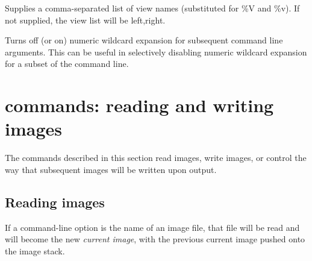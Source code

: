 Supplies a comma-separated list of view names (substituted for {\cf \%V}
and {\cf \%v}). If not supplied, the view list will be {\cf left,right}.
\apiend

Turns off (or on) numeric wildcard expansion for subsequent command
line arguments. This can be useful in selectively disabling numeric wildcard
expansion for a subset of the command line.
\apiend

\section{\oiiotool commands: reading and writing images}

The commands described in this section read images, write images,
or control the way that subsequent images will be written upon output.

\subsection*{Reading images}

\label{sec:oiiotool:i}
If a command-line option is the name of an image file, that file will
be read and will become the new \emph{current image}, with the previous
current image pushed onto the image stack.

